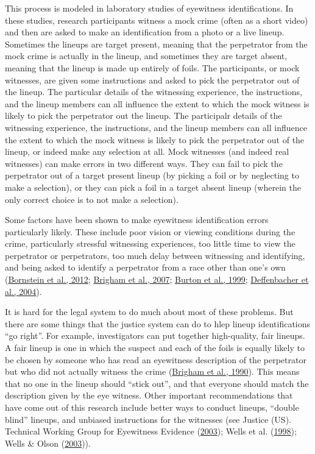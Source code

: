 \documentclass[
]{krantz}
\begin{document}
This process is modeled in laboratory studies of eyewitness identifications. In these studies, research participants witness a mock crime (often as a short video) and then are asked to make an identification from a photo or a live lineup. Sometimes the lineups are target present, meaning that the perpetrator from the mock crime is actually in the lineup, and sometimes they are target absent, meaning that the lineup is made up entirely of foils. The participants, or mock witnesses, are given some instructions and asked to pick the perpetrator out of the lineup. The particular details of the witnessing experience, the instructions, and the lineup members can all influence the extent to which the mock witness is likely to pick the perpetrator out the lineup. The participalr details of the witnessing experience, the instructions, and the lineup members can all influence the extent to which the mock witness is likely to pick the perpetrator out of the lineup, or indeed make any selection at all. Mock witnesses (and indeed real witnesses) can make errors in two different ways. They can fail to pick the perpetrator out of a target present lineup (by picking a foil or by neglecting to make a selection), or they can pick a foil in a target absent lineup (wherein the only correct choice is to not make a selection).

Some factors have been shown to make eyewitness identification errors particularly likely. These include poor vision or viewing conditions during the crime, particularly stressful witnessing experiences, too little time to view the perpetrator or perpetrators, too much delay between witnessing and identifying, and being asked to identify a perpetrator from a race other than one's own (\protect\hyperlink{ref-bornstein2012effects}{Bornstein et al., 2012}; \protect\hyperlink{ref-brigham2007influence}{Brigham et al., 2007}; \protect\hyperlink{ref-burton1999face}{Burton et al., 1999}; \protect\hyperlink{ref-deffenbacher2004meta}{Deffenbacher et al., 2004}).

It is hard for the legal system to do much about most of these problems. But there are some things that the justice system can do to hlep lineup identifications ``go right''. For example, investigators can put together high-quality, fair lineups. A fair lineup is one in which the suspect and each of the foils is equally likely to be chosen by someone who has read an eyewitness description of the perpetrator but who did not actually witness the crime (\protect\hyperlink{ref-brigham1990standards}{Brigham et al., 1990}). This means that no one in the lineup should ``stick out'', and that everyone should match the description given by the eye witness. Other important recommendations that have come out of this research include better ways to conduct lineups, ``double blind'' lineups, and unbiased instructions for the witnesses (see Justice (US). Technical Working Group for Eyewitness Evidence (\protect\hyperlink{ref-national2003eyewitness}{2003}); Wells et al. (\protect\hyperlink{ref-wells1998eyewitness}{1998}); Wells \& Olson (\protect\hyperlink{ref-wells2003eyewitness}{2003})).
\end{document}
